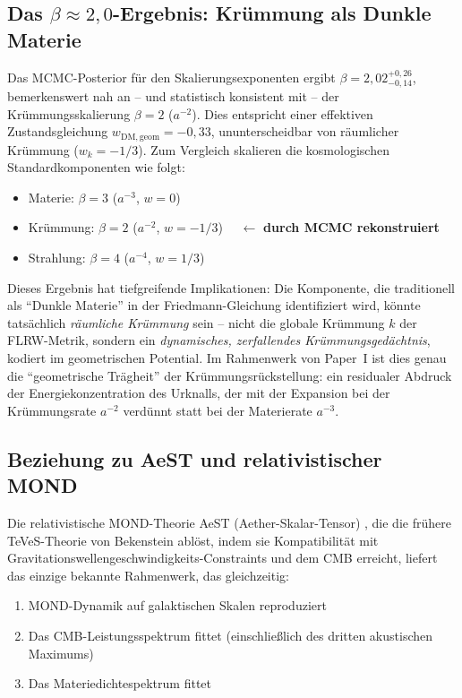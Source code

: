 \documentclass[aps,prd,twocolumn,superscriptaddress,nofootinbib]{revtex4-2}
\begin{document}
\subsection{Das $\beta \approx 2{,}0$-Ergebnis: Kr\"ummung als Dunkle Materie}

Das MCMC-Posterior f\"ur den Skalierungsexponenten ergibt $\beta = 2{,}02^{+0{,}26}_{-0{,}14}$, bemerkenswert nah an -- und statistisch konsistent mit -- der Kr\"ummungsskalierung $\beta = 2$ ($a^{-2}$). Dies entspricht einer effektiven Zustandsgleichung $w_{\mathrm{DM,geom}} = -0{,}33$, ununterscheidbar von r\"aumlicher Kr\"ummung ($w_k = -1/3$). Zum Vergleich skalieren die kosmologischen Standardkomponenten wie folgt:
\begin{itemize}
\item Materie: $\beta = 3$ ($a^{-3}$, $w = 0$)
\item Kr\"ummung: $\beta = 2$ ($a^{-2}$, $w = -1/3$) $\quad\leftarrow$ \textbf{durch MCMC rekonstruiert}
\item Strahlung: $\beta = 4$ ($a^{-4}$, $w = 1/3$)
\end{itemize}

Dieses Ergebnis hat tiefgreifende Implikationen: Die Komponente, die traditionell als "`Dunkle Materie"' in der Friedmann-Gleichung identifiziert wird, k\"onnte tats\"achlich \textit{r\"aumliche Kr\"ummung} sein -- nicht die globale Kr\"ummung $k$ der FLRW-Metrik, sondern ein \textit{dynamisches, zerfallendes Kr\"ummungsged\"achtnis}, kodiert im geometrischen Potential. Im Rahmenwerk von Paper~I ist dies genau die "`geometrische Tr\"agheit"' der Kr\"ummungsr\"uckstellung: ein residualer Abdruck der Energiekonzentration des Urknalls, der mit der Expansion bei der Kr\"ummungsrate $a^{-2}$ verd\"unnt statt bei der Materierate $a^{-3}$.

\subsection{Beziehung zu AeST und relativistischer MOND}

Die relativistische MOND-Theorie AeST (Aether-Skalar-Tensor) \cite{Skordis2021}, die die fr\"uhere TeVeS-Theorie von Bekenstein \cite{Bekenstein2004} abl\"ost, indem sie Kompatibilit\"at mit Gravitationswellengeschwindigkeits-Constraints und dem CMB erreicht, liefert das einzige bekannte Rahmenwerk, das gleichzeitig:
\begin{enumerate}
\item MOND-Dynamik auf galaktischen Skalen reproduziert
\item Das CMB-Leistungsspektrum fittet (einschließlich des dritten akustischen Maximums)
\item Das Materiedichtespektrum fittet
\end{enumerate}
\end{document}
